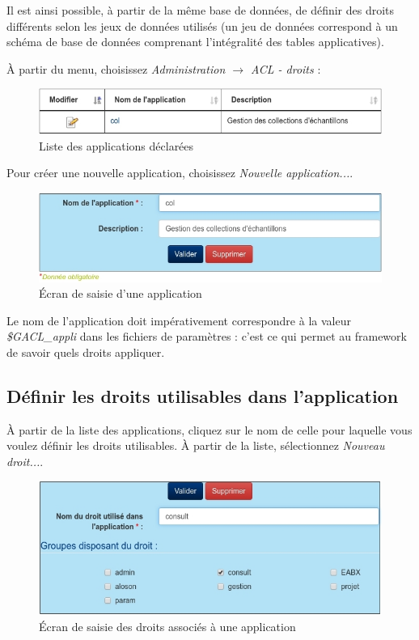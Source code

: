Il est ainsi possible, à partir de la même base de données, de définir des droits différents selon les jeux de données utilisés (un jeu de données correspond à un schéma de base de données comprenant l'intégralité des tables applicatives).

À partir du menu, choisissez \textit{Administration $\rightarrow$ ACL - droits} :
\begin{figure}[H]
\includegraphics[width=\linewidth]{dessin/liste_appli}
\caption{Liste des applications déclarées}
\end{figure}

Pour créer une nouvelle application, choisissez \textit{Nouvelle application...}. 

\begin{figure}[H]
\includegraphics[width=\linewidth]{dessin/appli_change}
\caption{Écran de saisie d'une application}
\end{figure}

Le nom de l'application doit impérativement correspondre à la valeur \textit{\$GACL\_appli} dans les fichiers de paramètres : c'est ce qui permet au framework de savoir quels droits appliquer.

\subsection{Définir les droits utilisables dans l'application}

À partir de la liste des applications, cliquez sur le nom de celle pour laquelle vous voulez définir les droits utilisables. 
À partir de la liste, sélectionnez \textit{Nouveau droit...}.

\begin{figure}[H]
\includegraphics[width=\linewidth]{dessin/appli_droit}
\caption{Écran de saisie des droits associés à une application}
\end{figure}

